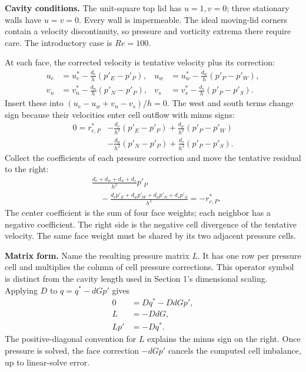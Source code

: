 \textbf{Cavity conditions.} The unit-square top lid has $u=1,v=0$; three stationary walls have $u=v=0$. Every wall is impermeable. The ideal moving-lid corners contain a velocity discontinuity, so pressure and vorticity extrema there require care. The introductory case is $Re=100$.
\newpage

\newpage

\newpage

\newpage

\newpage
{}
At each face, the corrected velocity is tentative velocity plus its correction:
\begin{align*}
u_e&=u_e^*-\frac{d_e}{h}(p'_E-p'_P),&
u_w&=u_w^*-\frac{d_w}{h}(p'_P-p'_W),\\
v_n&=v_n^*-\frac{d_n}{h}(p'_N-p'_P),&
v_s&=v_s^*-\frac{d_s}{h}(p'_P-p'_S).
\end{align*}
Insert these into $(u_e-u_w+v_n-v_s)/h=0$. The west and south terms change sign because their velocities enter cell outflow with minus signs:
\begin{align*}
0=r_{c,P}^*&-\frac{d_e}{h^2}(p'_E-p'_P)
+\frac{d_w}{h^2}(p'_P-p'_W)\\
&-\frac{d_n}{h^2}(p'_N-p'_P)
+\frac{d_s}{h^2}(p'_P-p'_S).
\end{align*}
Collect the coefficients of each pressure correction and move the tentative residual to the right:
\begin{align*}
&\frac{d_e+d_w+d_n+d_s}{h^2}p'_P\\
&\quad-\frac{d_ep'_E+d_wp'_W+d_np'_N+d_sp'_S}{h^2}
=-r_{c,P}^*.
\end{align*}
The center coefficient is the sum of four face weights; each neighbor has a negative coefficient. The right side is the negative cell divergence of the tentative velocity. The same face weight must be shared by its two adjacent pressure cells.

\textbf{Matrix form.} Name the resulting pressure matrix $L$. It has one row
per pressure cell and multiplies the column of cell pressure corrections.
This operator symbol is distinct from the cavity length used in Section 1's
dimensional scaling. Applying $D$ to $q=q^*-dGp'$ gives
\begin{align*}
0&=Dq^*-DdGp',\\
L&=-DdG,\\
Lp'&=-Dq^*.
\end{align*}
The positive-diagonal convention for $L$ explains the minus sign on the right. Once pressure is solved, the face correction $-dGp'$ cancels the computed cell imbalance, up to linear-solve error.

